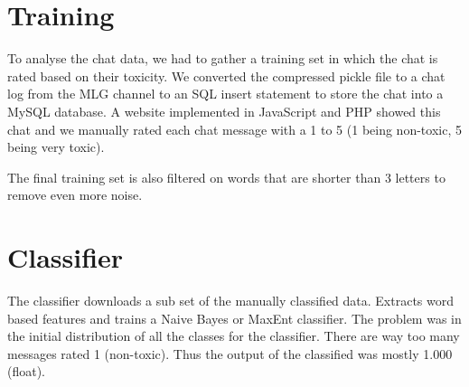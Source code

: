 \documentclass[final]{report}
\begin{document}
\section{Training}
To analyse the chat data, we had to gather a training set in which the chat is rated based on their toxicity.
We converted the compressed pickle file to a chat log from the MLG channel to an SQL insert statement to store the chat into a MySQL database.
A website implemented in JavaScript and PHP showed this chat and we manually rated each chat message with a 1 to 5 (1 being non-toxic, 5 being very toxic).

The final training set is also filtered on words that are shorter than 3 letters to remove even more noise.

\section{Classifier}
The classifier downloads a sub set of the manually classified data.
Extracts word based features and trains a Naive Bayes or MaxEnt classifier.
The problem was in the initial distribution of all the classes for the classifier.
There are way too many messages rated 1 (non-toxic).
Thus the output of the classified was mostly 1.000 (float).
\end{document}
